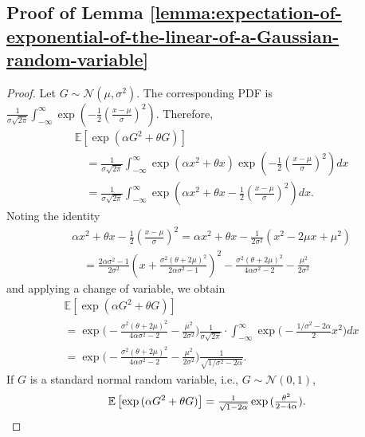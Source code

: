 \documentclass[lettersize,journal]{IEEEtran}
\newcommand{\gaussian}[2]{\mathcal{N}(#1, #2)}
\newcommand{\ex}[1]{\mathbb{E}\left[#1\right]}
\begin{document}
{\subsection{Proof of Lemma \ref{lemma:expectation-of-exponential-of-the-linear-of-a-Gaussian-random-variable}}
\label{proof of lemma:expectation-of-exponential-of-the-linear-of-a-Gaussian-random-variable}
\begin{proof} Let $G\sim \gaussian{\mu}{\sigma^2}$. The corresponding PDF is $\frac{1}{\sigma\sqrt{2\pi}}\int_{-\infty}^{\infty} \exp{(-\frac{1}{2}(\frac{x-\mu}{\sigma})^2)}$.
Therefore,
\begin{align*}
    &\ex{\exp{(\alpha G^2 + \theta G)}} \\
    &\quad= \tfrac{1}{\sigma \sqrt{2\pi}} \int_{-\infty}^{\infty} \exp{(\alpha x^2 + \theta x)}\exp{(-\tfrac{1}{2} (\tfrac{x-\mu}{\sigma})^2)} dx\\
    &\quad= \tfrac{1}{\sigma\sqrt{2\pi}}\int_{-\infty}^{\infty}\exp{\left(\alpha x^2 + \theta x - \tfrac{1}{2} (\tfrac{x-\mu}{\sigma})^2\right)} dx.
\end{align*}
Noting the identity
\begin{align*}
    &\alpha x^2 + \theta x - \tfrac{1}{2} (\tfrac{x-\mu}{\sigma})^2 = \alpha x^2 + \theta x - \tfrac{1}{2\sigma^2}(x^2 -2\mu x + \mu^2)\\
    &\quad= \tfrac{2\alpha \sigma^2 - 1}{2\sigma^2} (x + \tfrac{\sigma^2(\theta + 2\mu)^2}{2\alpha \sigma^2 -1})^2- \tfrac{\sigma^2(\theta+2\mu)^2}{4\alpha \sigma^2-2} - 
    \tfrac{\mu^2}{2\sigma^2}
\end{align*}
and applying a change of variable, we obtain
\begin{align*}
    &\ex{\exp{(\alpha G^2 + \theta G)}} \\
    &= \exp{\big(- \tfrac{\sigma^2(\theta+2\mu)^2}{4\alpha \sigma^2-2} - \tfrac{\mu^2}{2\sigma^2}\big)} \tfrac{1}{\sigma\sqrt{2\pi}}\cdot \int_{-\infty}^{\infty}\exp{\big(-\tfrac{1/\sigma^2 - 2\alpha}{2} x^2\big)} dx\\
    &= \exp{\big(- \tfrac{\sigma^2(\theta+2\mu)^2}{4\alpha \sigma^2-2} - \tfrac{\mu^2}{2\sigma^2}\big)}\tfrac{1}{\sqrt{1/\sigma^2 - 2\alpha}}.
\end{align*}
If $G$ is a standard normal random variable, i.e., $G\sim \gaussian{0}{1}$, 
\begin{equation*}
    \ex{\exp{(\alpha G^2 + \theta G)}} = \tfrac{1}{\sqrt{1-2\alpha}} \exp{(\tfrac{\theta^2}{2- 4\alpha})}.\qedhere
\end{equation*}
\end{proof}

}
\end{document}
